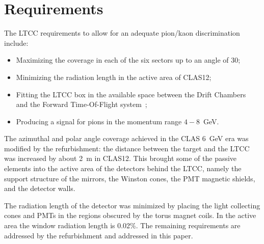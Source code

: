\section{Requirements}

The LTCC requirements to allow for an adequate pion/kaon discrimination include:

\begin{itemize}
	\item Maximizing the coverage in each of the six sectors up to an angle of 30\mdeg;
	\item Minimizing the radiation length in the active area of CLAS12;
	\item Fitting the LTCC box in the available space between the Drift Chambers~\cite{dc-nim} and the Forward
          Time-Of-Flight system~\cite{ftof-nim};
	\item Producing a signal for pions in the momentum range $4-8$~GeV.
\end{itemize}

The azimuthal and polar angle coverage achieved in the CLAS 6~GeV era was modified by the refurbishment: the
distance between the target and the LTCC was increased by about 2~m in CLAS12. This brought some of the passive
elements into the active area of the detectors behind the LTCC, namely the support structure of the mirrors, the
Winston cones, the PMT magnetic shields, and the detector walls.

The radiation length of the detector was minimized by placing the light collecting cones and PMTs in the regions
obscured by the torus magnet coils. In the active area the window radiation length is 0.02\%. The remaining
requirements are addressed by the refurbishment and addressed in this paper.
